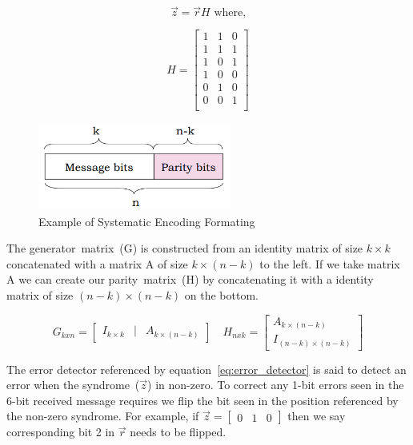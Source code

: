 \documentclass[12pt]{article}
\begin{document}
\begin{equation}
    \vec{z}=\vec{r}H \text{ where,}
    \label{eq:error_detector}
\end{equation}

$$
    H=
    \begin{bmatrix}
        1 & 1 & 0 \\
        1 & 1 & 1 \\
        1 & 0 & 1 \\
        1 & 0 & 0 \\
        0 & 1 & 0 \\
        0 & 0 & 1 \\
    \end{bmatrix}
$$

\begin{figure}[H]
    \centering
    \includegraphics[width=2.5in]{systematic_encoded.PNG}
    \caption{Example of Systematic Encoding Formating
             \cite{Balakrishnan2010}}
\end{figure}

The generator~matrix~(G) is constructed from an identity matrix of size 
$k\times k$ concatenated with a matrix A of size $k\times (n-k)$ to the 
left. If we take matrix A we can create our parity~matrix~(H) by 
concatenating it with a identity matrix of size $(n-k)\times (n-k)$ on the
bottom.

$$
    G_{kxn}=
    \begin{bmatrix}
        I_{k\times k} & | & A_{k\times (n-k)}
    \end{bmatrix}
    \quad
    H_{nxk}=
    \begin{bmatrix}
        A_{k\times (n-k)} \\ I_{(n-k)\times (n-k)}
    \end{bmatrix}
$$

The error detector referenced by equation~\ref{eq:error_detector} is said to 
detect an error when the syndrome~($\vec{z}$) in non-zero. To correct any 
1-bit errors seen in the 6-bit received message requires we flip the bit
seen in the position referenced by the non-zero syndrome. For example,
if $\vec{z}=\begin{bmatrix} 0 & 1 & 0 \end{bmatrix}$ then we say corresponding
bit 2 in $\vec{r}$ needs to be flipped.
\end{document}
